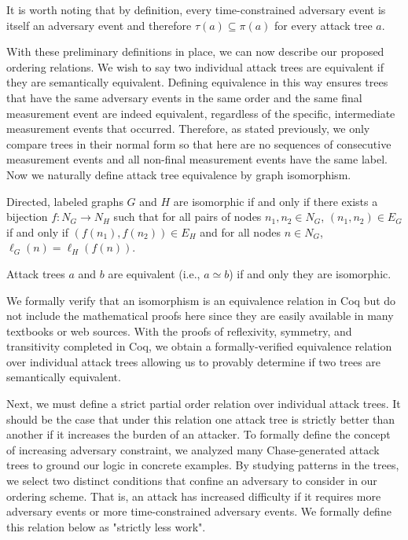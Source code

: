 \documentclass[runningheads]{llncs}
\theoremstyle{definition}
\begin{document}
\noindent It is worth noting that by definition, every time-constrained adversary event is itself an adversary event and therefore $\tau(a) \subseteq \pi(a)$ for every attack tree $a$.


With these preliminary definitions in place, we can now describe our proposed ordering relations. We wish to say two individual attack trees are equivalent if they are semantically equivalent. Defining equivalence in this way ensures trees that have the same adversary events in the same order and the same final measurement event are indeed equivalent, regardless of the specific, intermediate measurement events that occurred. Therefore, as stated previously, we only compare trees in their normal form so that here are no sequences of consecutive measurement events and all non-final measurement events have the same label. Now we naturally define attack tree equivalence by graph isomorphism.


\begin{definition}[Isomorphism]
    Directed, labeled graphs $G$ and $H$ are isomorphic if and only if there exists a bijection $f : N_G \to N_H$ such that for all pairs of nodes $n_1, n_2 \in N_G$, $(n_1,n_2) \in E_G$ if and only if $(f(n_1),f(n_2)) \in E_H$ and for all nodes $n \in N_G$, $\ell_G(n) = \ell_H(f(n))$.
\end{definition}


\begin{definition}
  Attack trees $a$ and $b$ are equivalent (i.e., $a \simeq b$) if and only they are isomorphic.
\end{definition}


\noindent We formally verify that an isomorphism is an equivalence relation in Coq but do not include the mathematical proofs here since they are easily available in many textbooks or web sources. With the proofs of reflexivity, symmetry, and transitivity completed in Coq, we obtain a formally-verified equivalence relation over individual attack trees allowing us to provably determine if two trees are semantically equivalent.


Next, we must define a strict partial order relation over individual attack trees. It should be the case that under this relation one attack tree is strictly better than another if it increases the burden of an attacker. To formally define the concept of increasing adversary constraint, we analyzed many Chase-generated attack trees to ground our logic in concrete examples. By studying patterns in the trees, we select two distinct conditions that confine an adversary to consider in our ordering scheme. That is, an attack has increased difficulty if it requires more adversary events or more time-constrained adversary events. We formally define this relation below as "strictly less work".
\end{document}
